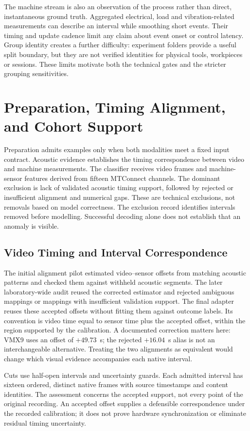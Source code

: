 The machine stream is also an observation of the process rather than direct,
instantaneous ground truth. Aggregated electrical, load and vibration-related
measurements can describe an interval while smoothing short events. Their timing and
update cadence limit any claim about event onset or control latency. Group identity
creates a further difficulty: experiment folders provide a useful split boundary, but
they are not verified identities for physical tools, workpieces or sessions. These
limits motivate both the technical gates and the stricter grouping sensitivities.

\section{Preparation, Timing Alignment, and Cohort Support}
Preparation admits examples only when both modalities meet a fixed input contract.
Acoustic evidence establishes the timing correspondence between video and machine
measurements. The classifier receives video frames and machine-sensor features derived
from fifteen MTConnect channels. The dominant exclusion is lack of validated acoustic timing support, followed by rejected or
insufficient alignment and numerical gaps. These are technical exclusions, not removals
based on model correctness. The exclusion record identifies intervals removed before
modelling. Successful decoding alone does not establish that an anomaly is visible.

\subsection{Video Timing and Interval Correspondence}
The initial alignment pilot estimated video--sensor offsets from matching acoustic
patterns and checked them against withheld acoustic segments. The later laboratory-wide
audit reused the corrected estimator and rejected ambiguous mappings or mappings with
insufficient validation support. The final adapter reuses these accepted offsets without
fitting them against outcome labels. Its convention is video time equal to
sensor time plus the accepted offset, within the region supported by the calibration. A
documented correction matters here: VMX9 uses an offset of $+49.73$~s; the rejected
$+16.04$~s alias is not an interchangeable alternative. Treating the two alignments as
equivalent would change which visual evidence accompanies each native interval.

Cuts use half-open intervals and uncertainty guards. Each admitted interval has sixteen
ordered, distinct native frames with source timestamps and content identities. The
assessment concerns the accepted support, not every point of the original recording. An
accepted offset supplies a defensible correspondence under the recorded calibration; it
does not prove hardware synchronization or eliminate residual timing uncertainty.

